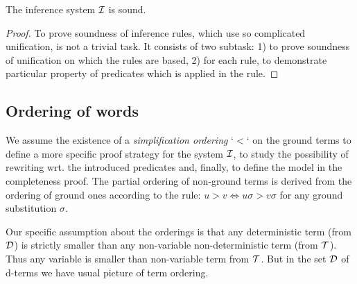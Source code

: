 \begin{theorem} \label{th:soundness}
The inference system $\mbox {$\cal I$}$ is sound.
\end{theorem}
\begin{proof} 
To prove soundness of inference rules, which use so complicated
unification, is not a trivial task. It consists of two subtask: 1) to prove
soundness of unification on which the rules are based, 2) for each rule, to
demonstrate particular property of predicates which is applied in the rule.
\end{proof}

\subsection{Ordering of words}

We assume the existence of a {\em simplification ordering} `$<$` on 
the ground terms \cite{Der}
to define a more specific proof
strategy for the system $\mbox {$\cal I$}$, to study the possibility of rewriting
wrt. the introduced predicates and, finally, to define the model in the
completeness proof. 
%
The partial ordering of
non-ground terms is derived from the ordering of ground ones
according to the rule: $u > v \Leftrightarrow u\sigma > v\sigma$
for any ground substitution $\sigma$.

Our specific assumption about the orderings is that any deterministic term
(from ${\cal D}$) is strictly smaller than any non-variable non-deterministic
term (from \({\cal T}\)). Thus any variable is smaller than non-variable term
from ${\cal T}$.  But in the set ${\cal D}$ of d-terms we have usual picture of
term ordering.

